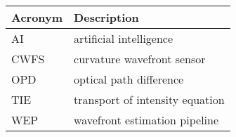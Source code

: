 \addtocounter{table}{-1}
\begin{longtable}{p{}p{}}\hline
\textbf{Acronym} & \textbf{Description}  \\\hline

AI & artificial intelligence \\\hline
CWFS & curvature wavefront sensor \\\hline
OPD & optical path difference \\\hline
TIE & transport of intensity equation \\\hline
WEP & wavefront estimation pipeline \\\hline
\end{longtable}
